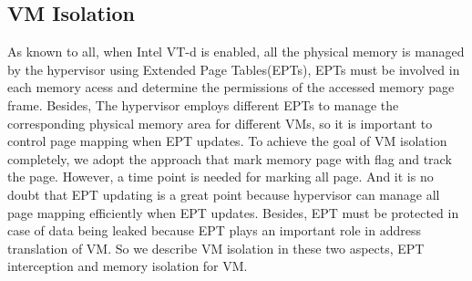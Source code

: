 \documentclass[conference]{IEEEtran}
\begin{document}
\subsection{VM Isolation}\label{VMISolation}

As known to all, when Intel VT-d is enabled, all the physical memory is managed by the hypervisor using Extended Page Tables(EPTs), EPTs must be involved in each memory acess and determine the permissions of the accessed memory page frame. Besides, The hypervisor employs different EPTs to manage the corresponding physical memory area for different VMs, so 
it is important to control page mapping when EPT updates. To achieve the goal of VM isolation completely, we adopt the approach that mark memory page with flag and track the page. However, a time point is needed for marking all page. And it is no doubt that EPT updating is a great point because hypervisor can manage all page mapping efficiently when EPT updates. Besides, EPT must be protected in case of data being leaked because EPT plays an important role in address translation of VM. So we describe VM isolation in these two aspects, EPT interception and memory isolation for VM.
\end{document}
